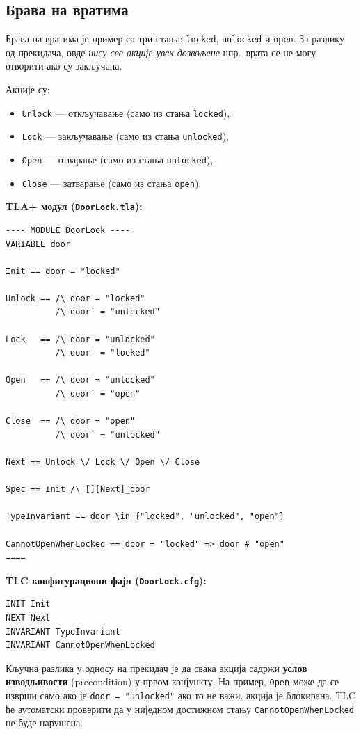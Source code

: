 \subsection{Брава на вратима}
\begin{primer}
Брава на вратима је пример са три стања: \texttt{locked}, \texttt{unlocked} и \texttt{open}.
За разлику од прекидача, овде \emph{нису све акције увек дозвољене} нпр.\ врата се не могу отворити ако су закључана.

Акције су:
\begin{itemize}
    \item \texttt{Unlock} --- откључавање (само из стања \texttt{locked}),
    \item \texttt{Lock} --- закључавање (само из стања \texttt{unlocked}),
    \item \texttt{Open} --- отварање (само из стања \texttt{unlocked}),
    \item \texttt{Close} --- затварање (само из стања \texttt{open}).
\end{itemize}

\textbf{TLA+ модул (\texttt{DoorLock.tla}):}
\begin{lstlisting}
---- MODULE DoorLock ----
VARIABLE door

Init == door = "locked"

Unlock == /\ door = "locked"
          /\ door' = "unlocked"

Lock   == /\ door = "unlocked"
          /\ door' = "locked"

Open   == /\ door = "unlocked"
          /\ door' = "open"

Close  == /\ door = "open"
          /\ door' = "unlocked"

Next == Unlock \/ Lock \/ Open \/ Close

Spec == Init /\ [][Next]_door

TypeInvariant == door \in {"locked", "unlocked", "open"}

CannotOpenWhenLocked == door = "locked" => door # "open"
====
\end{lstlisting}

\textbf{TLC конфигурациони фајл (\texttt{DoorLock.cfg}):}
\begin{lstlisting}
INIT Init
NEXT Next
INVARIANT TypeInvariant
INVARIANT CannotOpenWhenLocked
\end{lstlisting}

Кључна разлика у односу на прекидач је да свака акција садржи \textbf{услов изводљивости} (precondition) у првом конјункту.
На пример, \texttt{Open} може да се изврши само ако је \texttt{door = "unlocked"} ако то не важи, акција је блокирана.
TLC ће аутоматски проверити да у ниједном достижном стању \texttt{CannotOpenWhenLocked} не буде нарушена.
\end{primer}

